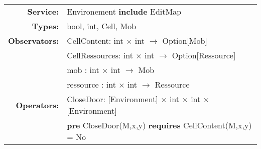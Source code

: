 \begin{tabular}{rl}
\textbf{Service:}	& Environement \textbf{include} EditMap\\
\textbf{Types:} & bool, int, Cell, Mob\\
\textbf{Observators:} & CellContent: int $\times$ int $\rightarrow$ Option[Mob]\\
&
CellRessources: int $\times$ int $\rightarrow$ Option[Ressource]\\
&
mob : int $\times$ int $\rightarrow$ Mob\\
&
ressource : int $\times$ int $\rightarrow$ Ressource\\
\textbf{Operators:}  & CloseDoor: [Environment] $\times$ int $\times$ int $\times$ [Environment]\\
& \quad 
\textbf{pre} CloseDoor(M,x,y) \textbf{requires} CellContent(M,x,y) = No
\end{tabular}

